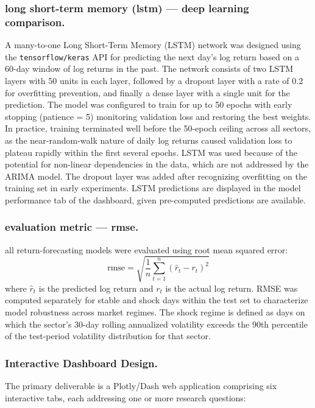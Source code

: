 \documentclass[12pt]{article}
\begin{document}
\subsubsection{long short-term memory (lstm) --- deep learning comparison.}
A many-to-one Long Short-Term Memory (LSTM) network was designed using the \texttt{tensorflow/keras} API for predicting the next day's log return based on a 60-day window of log returns in the past. The network consists of two LSTM layers with 50 units in each layer, followed by a dropout layer with a rate of 0.2 for overfitting prevention, and finally a dense layer with a single unit for the prediction. The model was configured to train for up to 50 epochs with early stopping (patience = 5) monitoring validation loss and restoring the best weights. In practice, training terminated well before the 50-epoch ceiling across all sectors, as the near-random-walk nature of daily log returns caused validation loss to plateau rapidly within the first several epochs. LSTM was used because of the potential for non-linear dependencies in the data, which are not addressed by the ARIMA model. The dropout layer was added after recognizing overfitting on the training set in early experiments. LSTM predictions are displayed in the model performance tab of the dashboard, given pre-computed predictions are available.

\subsubsection{evaluation metric --- rmse.}
all return-forecasting models were evaluated using root mean squared error:
\[
\text{rmse} = \sqrt{\frac{1}{n}\sum_{t=1}^{n}(\hat{r}_t - r_t)^2}
\]
where $\hat{r}_t$ is the predicted log return and $r_t$ is the actual log return. RMSE was computed separately for stable and shock days within the test set to characterize model robustness across market regimes. The shock regime is defined as days on which the sector's 30-day rolling annualized volatility exceeds the 90th percentile of the test-period volatility distribution for that sector.

\subsubsection{Interactive Dashboard Design.}
The primary deliverable is a Plotly/Dash web application comprising six interactive tabs, each addressing one or more research questions:
\end{document}

